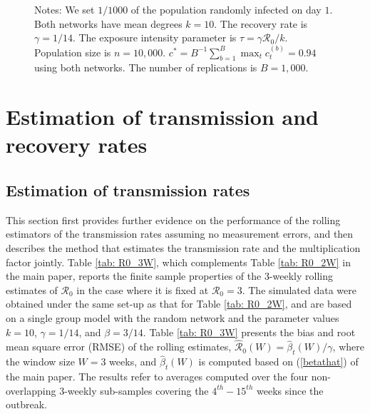 \documentclass[12pt]{article}
\begin{document}
\begin{figure}[ht!]
\begin{footnotesize}
\begin{center}
\end{center}

%

\vspace{-0.3cm}
Notes: We set $1/1000$ of the population randomly infected on day $1$. Both
networks have mean degrees $k=10$. The recovery rate is $\gamma=1/14$. The
exposure intensity parameter is $\tau=\gamma\mathcal{R}_{0}/k$. Population
size is $n=10,000$. $c^{\ast}=B^{-1}\sum_{b=1}^{B}\max_{t}c_{t}^{(b)}=0.94$
using both networks. The number of replications is $B=1,000.$%

\end{footnotesize}%
%

\end{figure}%


\section{Estimation of transmission and recovery rates
\label{Sup: estimation both}}

\subsection{Estimation of transmission rates \label{Sup: estimation}}

This section first provides further evidence on the performance of the rolling
estimators of the transmission rates assuming no measurement errors, and then
describes the method that estimates the transmission rate and the
multiplication factor jointly. Table \ref{tab: R0_3W}, which complements Table
\ref{tab: R0_2W} in the main paper, reports the finite sample properties of
the 3-weekly rolling estimates of $\mathcal{R}_{0}$ in the case where it is
fixed at $\mathcal{R}_{0}=3$. The simulated data were obtained under the same
set-up as that for Table \ref{tab: R0_2W}, and are based on a single group
model with the random network and the parameter values $k=10$, $\gamma=1/14$,
and $\beta=3/14$. Table \ref{tab: R0_3W} presents the bias and root mean
square error (RMSE) of the rolling estimates, $\mathcal{\hat{R}}_{0}\left(
W\right)  =\hat{\beta}_{t}\left(  W\right)  /\gamma$, where the window size
$W=3$ weeks, and $\hat{\beta}_{t}\left(  W\right)  $ is computed based on
(\ref{betathat}) of the main paper. The results refer to averages computed
over the four non-overlapping $3$-weekly sub-samples covering the
$4^{th}-15^{th}$ weeks since the outbreak.
\end{document}
